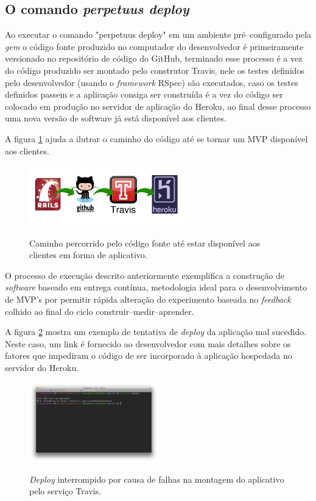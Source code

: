 \pagebreak
\subsection{O comando \emph{perpetuus deploy}}

Ao executar o comando "perpetuus deploy" em um ambiente pr\'e--configurado pela \emph{gem} o c\'odigo fonte produzido no computador do desenvolvedor \'e primeiramente versionado no reposit\'orio de c\'odigo do GitHub, terminado esse processo \'e a vez do c\'odigo produzido ser montado pelo construtor Travis, nele os testes definidos pelo desenvolvedor (usando o \emph{framework} RSpec) s\~ao executados, caso os testes definidos passem e a aplica\c{c}\~ao consiga ser constru\'ida \'e a vez do c\'odigo ser colocado em produ\c{c}\~ao no servidor de aplica\c{c}\~ao do Heroku, ao final desse processo uma nova vers\~ao de software j\'a est\'a dispon\'ivel aos clientes. 

A figura \ref{fig:fig11} ajuda a ilutrar o caminho do c\'odigo at\'e se tornar um MVP dispon\'ivel aos clientes.

\begin{figure}[h]
  \centering
  \caption{Caminho percorrido pelo c\'odigo fonte at\'e estar dispon\'ivel aos clientes em forma de aplicativo.}
  \includegraphics[width=0.6\textwidth]{./fig/cicloDeploy}
  \label{fig:fig11}
\end{figure}

O processo de execu\c{c}\~ao descrito anteriormente exemplifica a constru\c{c}\~ao de \emph{software} baseado em entrega cont\'inua, metodologia ideal para o desenvolvimento de MVP's por permitir r\'apida altera\c{c}\~ao do experimento baseada no \emph{feedback} colhido ao final do ciclo construir--medir--aprender.

\pagebreak

A figura \ref{fig:fig12} mostra um exemplo de tentativa de \emph{deploy} da aplica\c{c}\~ao mal sucedido. Neste caso, um link \'e fornecido ao desenvolvedor com mais detalhes sobre os fatores que impediram o c\'odigo de ser incorporado \`a aplica\c{c}\~ao hospedada no servidor do Heroku.

\begin{figure}[h]
  \centering
  \caption{\emph{Deploy} interrompido por causa de falhas na montagem do aplicativo pelo servi\c{c}o Travis.}
  \includegraphics[width=0.5\textwidth]{./fig/deploy1}
  \label{fig:fig12}
\end{figure}

